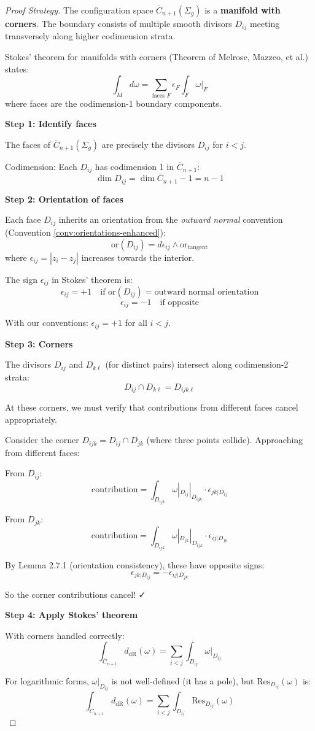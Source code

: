 \begin{proof}[Proof Strategy]
The configuration space $\overline{C}_{n+1}(\Sigma_g)$ is a \textbf{manifold with corners}. The boundary consists of multiple smooth divisors $D_{ij}$ meeting transversely along higher codimension strata.

Stokes' theorem for manifolds with corners (Theorem of Melrose, Mazzeo, et al.) states:
$$\int_M d\omega = \sum_{\text{faces } F} \epsilon_F \int_F \omega|_F$$
where faces are the codimension-1 boundary components.

\textbf{Step 1: Identify faces}

The faces of $\overline{C}_{n+1}(\Sigma_g)$ are precisely the divisors $D_{ij}$ for $i < j$.

Codimension: Each $D_{ij}$ has codimension 1 in $\overline{C}_{n+1}$:
$$\dim D_{ij} = \dim \overline{C}_{n+1} - 1 = n - 1$$

\textbf{Step 2: Orientation of faces}

Each face $D_{ij}$ inherits an orientation from the \emph{outward normal} convention (Convention \ref{conv:orientations-enhanced}):
$$\text{or}(D_{ij}) = d\epsilon_{ij} \wedge \text{or}_{\text{tangent}}$$
where $\epsilon_{ij} = |z_i - z_j|$ increases towards the interior.

The sign $\epsilon_{ij}$ in Stokes' theorem is:
$$\epsilon_{ij} = +1 \quad \text{if } \text{or}(D_{ij}) = \text{outward normal orientation}$$
$$\epsilon_{ij} = -1 \quad \text{if opposite}$$

With our conventions: $\epsilon_{ij} = +1$ for all $i < j$.

\textbf{Step 3: Corners}

The divisors $D_{ij}$ and $D_{k\ell}$ (for distinct pairs) intersect along codimension-2 strata:
$$D_{ij} \cap D_{k\ell} = D_{ijk\ell}$$

At these corners, we must verify that contributions from different faces cancel appropriately.

Consider the corner $D_{ijk} = D_{ij} \cap D_{jk}$ (where three points collide). Approaching from different faces:

From $D_{ij}$:
$$\text{contribution} = \int_{D_{ijk}} \omega|_{D_{ij}}|_{D_{ijk}} \cdot \epsilon_{jk|D_{ij}}$$

From $D_{jk}$:
$$\text{contribution} = \int_{D_{ijk}} \omega|_{D_{jk}}|_{D_{ijk}} \cdot \epsilon_{ij|D_{jk}}$$

By Lemma 2.7.1 (orientation consistency), these have opposite signs:
$$\epsilon_{jk|D_{ij}} = -\epsilon_{ij|D_{jk}}$$

So the corner contributions cancel! ✓

\textbf{Step 4: Apply Stokes' theorem}

With corners handled correctly:
$$\int_{\overline{C}_{n+1}} d_{\text{dR}}(\omega) = \sum_{i<j} \int_{D_{ij}} \omega|_{D_{ij}}$$

For logarithmic forms, $\omega|_{D_{ij}}$ is not well-defined (it has a pole), but $\text{Res}_{D_{ij}}(\omega)$ is:
$$\int_{\overline{C}_{n+1}} d_{\text{dR}}(\omega) = \sum_{i<j} \int_{D_{ij}} \text{Res}_{D_{ij}}(\omega)$$
\end{proof}


